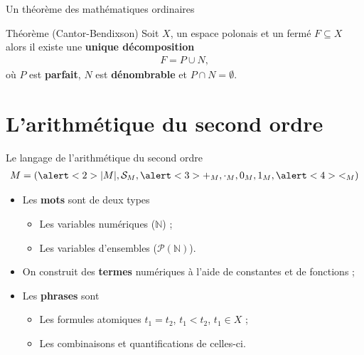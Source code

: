 \documentclass{beamer} %
\newcommand{\N}{\mathbb{N}}
\begin{document}

\begin{frame}{Un théorème des mathématiques ordinaires}
    \begin{block}{Théorème (Cantor-Bendixson)}
        Soit $X$, un espace polonais et un fermé $F \subseteq X$ alors il existe une \textbf{ unique décomposition} \begin{align*}
            F = P \cup N,
        \end{align*}
        où $P$ est \textbf{parfait}, $N$ est \textbf{dénombrable} et $P \cap N = \emptyset$.
    \end{block}
\end{frame}



\section{L'arithmétique du second ordre}

\begin{frame}{Le langage de l'arithmétique du second ordre}
    \begin{align*}
        M = (\alert<2>{|M|, \mathcal{S}_M}, \alert<3>{+_M, \cdot_M, 0_M, 1_M}, \alert<4>{<_M})
    \end{align*}
    \begin{itemize}
        \item<2-> Les \textbf{mots} sont de deux types 
        \begin{itemize}
            \item Les variables numériques ($\N$) ; 
            \item Les variables d'ensembles ($\mathcal{P}(\N)$).
        \end{itemize}
        \item<3-> On construit des \textbf{termes} numériques à l'aide de constantes et de fonctions ;
        \item<4-> Les \textbf{phrases} sont 
        \begin{itemize}
            \item Les formules atomiques $t_1 = t_2$, $t_1 < t_2$, $t_1 \in X$ ;
            \item Les combinaisons et quantifications de celles-ci.
        \end{itemize}
    \end{itemize}
\end{frame}
\end{document}
